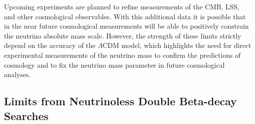 Upcoming experiments are planned to refine measurements of the CMB, LSS, and other cosmological observables. With this additional data it is possible that in the near future cosmological measurements will be able to positively constrain the neutrino absolute mass scale. However, the strength of these limits strictly depend on the accuracy of the $\Lambda$CDM model, which highlights the need for direct experimental measurements of the neutrino mass to confirm the predictions of cosmology and to fix the neutrino mass parameter in future cosmological analyses.

\subsection{Limits from Neutrinoless Double Beta-decay Searches}

